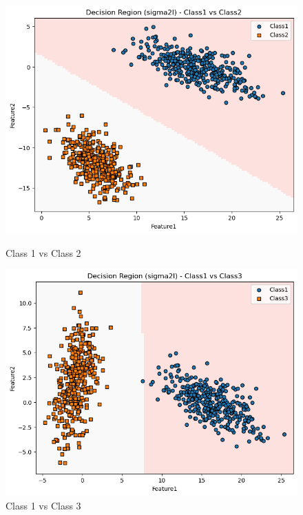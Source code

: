 \begin{figure}[H]
    \centering
    \begin{minipage}{0.32\linewidth}
        \includegraphics[width=\linewidth]{images/LS_Group04_images/01_sigma2i/02_decision_region_c1_c2.png}
        \caption*{Class 1 vs Class 2}
    \end{minipage}
    \hfill
    \begin{minipage}{0.32\linewidth}
        \includegraphics[width=\linewidth]{images/LS_Group04_images/01_sigma2i/03_decision_region_c1_c3.png}
        \caption*{Class 1 vs Class 3}
    \end{minipage}
    \hfill
    \begin{minipage}{0.32\linewidth}

\end{minipage}
\end{figure}
